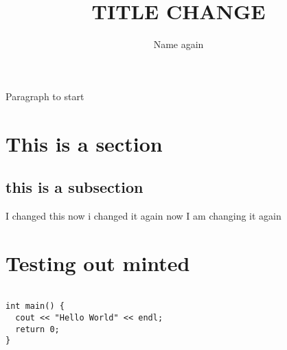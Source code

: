 \documentclass{tufte-book}
\title{TITLE CHANGE}
\author[Name]{Name again}
\begin{document}
\maketitle %



Paragraph to start

\section{This is a section}\label{sec:Section 1}
\subsection{this is a subsection}\label{sec:subsection}
I changed this now i changed it again now I am changing it again


\section{Testing out minted}
\begin{verbatim}

int main() {
  cout << "Hello World" << endl;
  return 0;
}
\end{verbatim}
\end{document}
